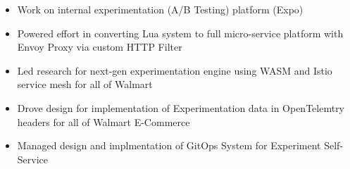 \documentclass[10pt,a4paper,ragged2e,withhyper]{altacv}
\begin{document}
\begin{paracol}{2}
  \begin{itemize}
    \item Work on internal experimentation (A/B Testing) platform (Expo)
    \item Powered effort in converting Lua system to full micro-service platform with Envoy Proxy via custom HTTP Filter
    \item Led research for next-gen experimentation engine using WASM and Istio service mesh for all of Walmart %
    \item Drove design for implementation of Experimentation data in OpenTelemtry headers for all of Walmart E-Commerce
    \item Managed design and implmentation of GitOps System for Experiment Self-Service
  \end{itemize}
  
  
  
  

\end{paracol}
\end{document}
